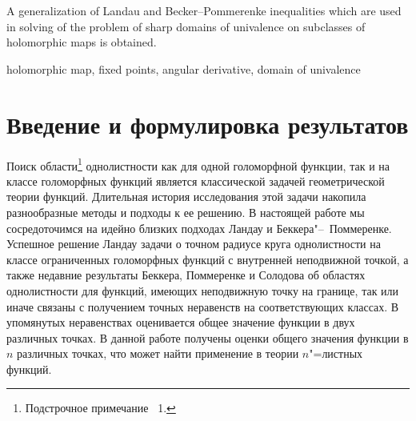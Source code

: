 \documentclass{article}
\theoremstyle{definition}
\theoremstyle{plain}
\begin{document}
\begin{altabstract}
A generalization of Landau and Becker--Pommerenke inequalities which are used in solving  of the problem of sharp  domains  of univalence on subclasses of holomorphic maps is obtained.	
\end{altabstract}

\begin{altkeywords}
holomorphic map, fixed points, angular derivative, domain of univalence
\end{altkeywords}

\makeatletter



\section*{Введение и формулировка результатов}

Поиск области\footnote{Подстрочное примечание \No~1.}
однолистности как для  одной голоморфной функции, так и на классе голоморфных функций является классической задачей геометрической теории функций. Длительная история исследования этой задачи накопила разнообразные методы и подходы к ее решению. В настоящей работе
мы сосредоточимся на идейно близких подходах Ландау и Беккера"--~Поммеренке.
Успешное решение Ландау задачи о точном радиусе круга однолистности на классе ограниченных голоморфных функций с внутренней неподвижной точкой, а также недавние результаты Беккера, Поммеренке и Солодова об областях однолистности для функций, имеющих неподвижную точку на границе, так или иначе связаны с получением точных неравенств на соответствующих классах. В упомянутых неравенствах оценивается общее значение функции в двух различных точках. В данной работе получены оценки общего значения функции в $n$ различных точках, что может найти применение в теории $n$"=листных функций.
\end{document}
